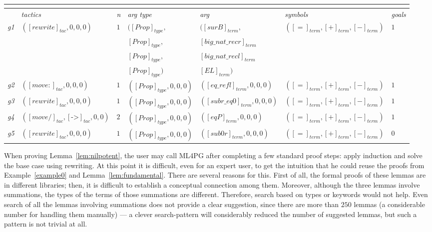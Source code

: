 \begin{table}
{{\begin{tabular}{|l||l|l|l|l|l|l|}
 \multicolumn{7}{c}{}\\
 \hline
 & \emph{tactics} & \emph{n} & \emph{arg type} & \emph{arg} & \emph{symbols} & \emph{goals} \\
\hline
\hline
\emph{g1}&  $([rewrite]_{tac},0,0,0)$ & $1$  & $([Prop]_{type},$ & $([surB]_{term},$  & $([=]_{term},[+]_{term},[-]_{term})$& $1$ \\
 & & & $[Prop]_{type},$ & $[big\_nat\_recr]_{term}$ & & \\
 & & & $[Prop]_{type},$& $[big\_nat\_recl]_{term}$ & & \\
 & & & $[Prop]_{type})$& $[EL]_{term})$ & & \\
 \hline
  \emph{g2} & $([move:]_{tac},0,0,0)$ & $1$  & $([Prop]_{type},0,0,0)$ &  $([eq\_refl]_{term},0,0,0)$  & $([=]_{term},[+]_{term},[-]_{term})$ & $1$ \\
 \hline
  \emph{g3} & $([rewrite]_{tac},0,0,0)$ & $1$  & $([Prop]_{type},0,0,0)$  & $([subr\_eq0]_{term},0,0,0)$ & $([=]_{term},[+]_{term},[-]_{term})$ & $1$ \\
 \hline
\emph{g4}& $([move/]_{tac},[\texttt{->}]_{tac},0,0)$ & $2$  & $([Prop]_{type},0,0,0)$  & $([eqP]_{term},0,0,0)$ & $([=]_{term},[+]_{term},[-]_{term})$ & $1$ \\
 \hline
  \emph{g5} & $([rewrite]_{tac},0,0,0)$ & $1$  & $([Prop]_{type},0,0,0)$  & $([sub0r]_{term},0,0,0)$ & $([=]_{term},[+]_{term},[-]_{term})$ & $0$ \\
 \hline
  \end{tabular} 
  }}
 \end{table}


When proving Lemma~\ref{lem:nilpotent}, the user may call ML4PG after completing a few standard proof steps: apply induction and solve the base case using rewriting.
At this point it is difficult, even for an expert user, %
to get the intuition that he could reuse the proofs from Example~\ref{example0} and Lemma~\ref{lem:fundamental}. There are several reasons for this.
First of all, the formal proofs of these lemmas are in different libraries; then, it is difficult to establish a conceptual connection among them. Moreover,
although the three lemmas involve summations,
the types of the terms of those summations are different. Therefore, search based on types or keywords would not help. Even search  %
of all the lemmas involving summations does not provide a clear suggestion, since there are more than $250$ lemmas (a considerable number for handling them manually) --- a clever search-pattern will considerably reduced the number of suggested lemmas, but such a pattern is not trivial at all.


